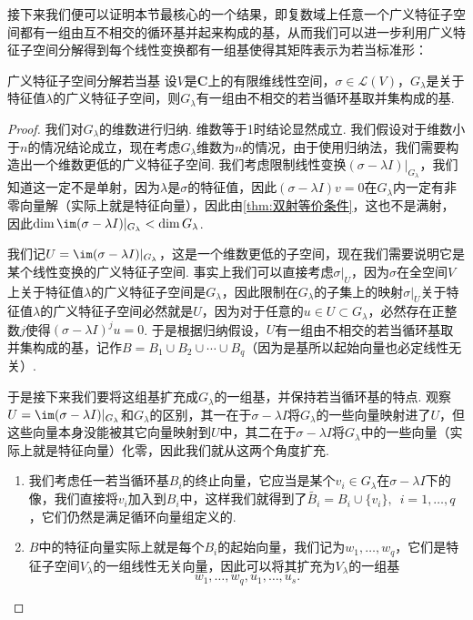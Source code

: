 接下来我们便可以证明本节最核心的一个结果，即复数域上任意一个广义特征子空间都有一组由互不相交的循环基并起来构成的基，从而我们可以进一步利用广义特征子空间分解得到每个线性变换都有一组基使得其矩阵表示为若当标准形：
\begin{theorem}{}{广义特征子空间分解若当基}
    设$V$是$\mathbf{C}$上的有限维线性空间，$\sigma\in\mathcal{L}(V)$，$G_\lambda$是关于特征值$\lambda$的广义特征子空间，则$G_\lambda$有一组由不相交的若当循环基取并集构成的基.
\end{theorem}
\begin{proof}
    我们对$G_\lambda$的维数进行归纳. 维数等于1时结论显然成立. 我们假设对于维数小于$n$的情况结论成立，现在考虑$G_\lambda$维数为$n$的情况，由于使用归纳法，我们需要构造出一个维数更低的广义特征子空间. 我们考虑限制线性变换$(\sigma-\lambda I)\vert_{G_\lambda}$，我们知道这一定不是单射，因为$\lambda$是$\sigma$的特征值，因此$(\sigma-\lambda I)v=0$在$G_\lambda$内一定有非零向量解（实际上就是特征向量），因此由\autoref{thm:双射等价条件}，这也不是满射，因此$\dim\im(\sigma-\lambda I)\vert_{G_\lambda}<\dim G_\lambda$.

    我们记$U=\im(\sigma-\lambda I)\vert_{G_\lambda}$，这是一个维数更低的子空间，现在我们需要说明它是某个线性变换的广义特征子空间. 事实上我们可以直接考虑$\sigma\vert_U$，因为$\sigma$在全空间$V$上关于特征值$\lambda$的广义特征子空间是$G_\lambda$，因此限制在$G_\lambda$的子集上的映射$\sigma\vert_U$关于特征值$\lambda$的广义特征子空间必然就是$U$，因为对于任意的$u\in U\subset G_\lambda$，必然存在正整数$j$使得$(\sigma-\lambda I)^ju=0$. 于是根据归纳假设，$U$有一组由不相交的若当循环基取并集构成的基，记作$B=B_1\cup B_2\cup\cdots\cup B_q$（因为是基所以起始向量也必定线性无关）.

    于是接下来我们要将这组基扩充成$G_\lambda$的一组基，并保持若当循环基的特点. 观察$U=\im(\sigma-\lambda I)\vert_{G_\lambda}$和$G_\lambda$的区别，其一在于$\sigma-\lambda I$将$G_\lambda$的一些向量映射进了$U$，但这些向量本身没能被其它向量映射到$U$中，其二在于$\sigma-\lambda I$将$G_\lambda$中的一些向量（实际上就是特征向量）化零，因此我们就从这两个角度扩充.
    \begin{enumerate}
        \item 我们考虑任一若当循环基$B_i$的终止向量，它应当是某个$v_i\in G_\lambda$在$\sigma-\lambda I$下的像，我们直接将$v_i$加入到$B_i$中，这样我们就得到了$\tilde{B_i}=B_i\cup\{v_i\},\enspace i=1,\ldots,q$，它们仍然是满足循环向量组定义的.
        \item $B$中的特征向量实际上就是每个$B_i$的起始向量，我们记为$w_1,\ldots,w_q$，它们是特征子空间$V_\lambda$的一组线性无关向量，因此可以将其扩充为$V_\lambda$的一组基
              \[w_1,\ldots,w_q,u_1,\ldots,u_s.\]
    \end{enumerate}


\end{proof}
